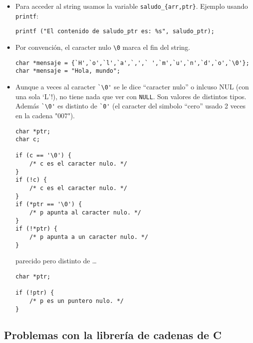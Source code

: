 \documentclass[12pt,a4paper,spanish]{article}
\begin{document}
\begin{itemize}
En cambio, el puntero \verb+saludo_ptr+ puede ser eventualmente
re-apuntado a otra zona de memoria, pero si se trata de modificar el
contenido del string se obtiene un resultado indefinido\footnote{Cuando el
estándar de C dice ``esto produce un resultado indefinido'' quiere decir que
su programa puede fallar intermitentemente, de formas distintas, y en
condiciones poco esperadas.}.

\item Para acceder al string usamos la variable
\verb|saludo_{arr,ptr}|. Ejemplo usando \verb+printf+:

\begin{verbatim}
printf ("El contenido de saludo_ptr es: %s", saludo_ptr);
\end{verbatim}

\item Por convención, el caracter nulo \verb+\0+ marca el fin del
string.

\begin{verbatim}
char *mensaje = {`H',`o',`l',`a',`,',` ',`m',`u',`n',`d',`o',`\0'};
char *mensaje = "Hola, mundo";
\end{verbatim}

\item Aunque a veces al caracter \verb+`\0'+ se le dice ``caracter nulo'' o
inlcuso NUL (con una sola `L'!), no tiene nada que ver con
\verb+NULL+. Son valores de distintos tipos. Además \verb+`\0'+ es distinto
de \verb+`0'+ (el caracter del simbolo ``cero'' usado 2 veces en la cadena 
"007").

\begin{verbatim}
char *ptr;
char c;

if (c == '\0') {
    /* c es el caracter nulo. */
}
if (!c) {
    /* c es el caracter nulo. */
}
if (*ptr == '\0') {
    /* p apunta al caracter nulo. */
}
if (!*ptr) {
    /* p apunta a un caracter nulo. */
}

\end{verbatim}

parecido pero distinto de \ldots

\begin{verbatim}
char *ptr;

if (!ptr) {
    /* p es un puntero nulo. */
}
\end{verbatim}

\end{itemize}

\subsection*{Problemas con la librería de cadenas de \textsf{C}}
\end{document}

